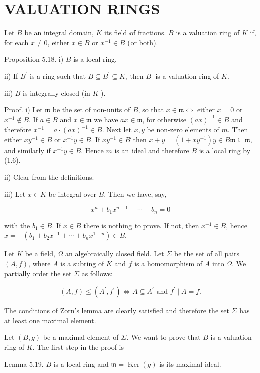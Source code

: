 \documentclass{standalone}
\theoremstyle{definition}
\theoremstyle{remark}
\begin{document}
\section{VALUATION RINGS}
Let $B$ be an integral domain, $K$ its field of fractions. $B$ is a valuation ring of $K$ if, for each $x \neq 0$, either $x \in B$ or $x^{-1} \in B$ (or both).

Proposition 5.18. i) $B$ is a local ring.

ii) If $B^{\prime}$ is a ring such that $B \subseteq B^{\prime} \subseteq K$, then $B^{\prime}$ is a valuation ring of $K$.

iii) $B$ is integrally closed (in $K$ ).

Proof. i) Let $\mathfrak{m}$ be the set of non-units of $B$, so that $x \in \mathfrak{m} \Leftrightarrow$ either $x=0$ or $x^{-1} \notin B$. If $a \in B$ and $x \in \mathfrak{m}$ we have $a x \in \mathfrak{m}$, for otherwise $(a x)^{-1} \in B$ and therefore $x^{-1}=a \cdot(a x)^{-1} \in B$. Next let $x, y$ be non-zero elements of $m$. Then either $x y^{-1} \in B$ or $x^{-1} y \in B$. If $x y^{-1} \in B$ then $x+y=\left(1+x y^{-1}\right) y \in B \mathfrak{m} \subseteq \mathfrak{m}$, and similarly if $x^{-1} y \in B$. Hence $m$ is an ideal and therefore $B$ is a local ring by (1.6).

ii) Clear from the definitions.

iii) Let $x \in K$ be integral over $B$. Then we have, say,

\[
x^{n}+b_{1} x^{n-1}+\cdots+b_{n}=0
\]

with the $b_{1} \in B$. If $x \in B$ there is nothing to prove. If not, then $x^{-1} \in B$, hence $x=-\left(b_{1}+b_{2} x^{-1}+\cdots+b_{n} x^{1-n}\right) \in B$.

Let $K$ be a field, $\Omega$ an algebraically closed field. Let $\Sigma$ be the set of all pairs $(A, f)$, where $A$ is a subring of $K$ and $f$ is a homomorphism of $A$ into $\Omega$. We partially order the set $\Sigma$ as follows:

\[
(A, f) \leqslant\left(A^{\prime}, f^{\prime}\right) \Leftrightarrow A \subseteq A^{\prime} \text { and } f^{\prime} \mid A=f .
\]

The conditions of Zorn's lemma are clearly satisfied and therefore the set $\Sigma$ has at least one maximal element.

Let $(B, g)$ be a maximal element of $\Sigma$. We want to prove that $B$ is a valuation ring of $K$. The first step in the proof is

Lemma 5.19. $B$ is a local ring and $\mathfrak{m}=\operatorname{Ker}(g)$ is its maximal ideal.
\end{document}
